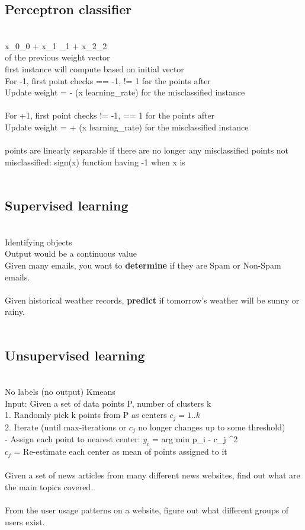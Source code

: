 \documentclass[11pt]{article}
\begin{document}
\subsection*{Perceptron classifier}\\
x_{0}\theta_{0} + x_{1} \theta_{1} + x_{2}\theta_{2}\\\) of the previous weight vector
\\
first instance will compute based on initial vector\\
For -1, first point checks == -1, != 1 for the points after\\
Update weight = - (x \times\) learning\_rate) for the misclassified instance\\
\\\)
For +1, first point checks != -1, == 1 for the points after\\
Update weight =  + (x \times\) learning\_rate) for the misclassified instance\\
\\
points are linearly separable if there are no longer any misclassified points
not misclassified: sign(x) function having -1 when x is 
\\\\
\subsection*{Supervised learning}\\
Identifying objects \\
Output would be a continuous value\\
Given many emails, you want to \textbf{determine} if they are Spam or Non-Spam emails.
\\
\\
Given historical weather records, \textbf{predict} if tomorrow's weather will be sunny or rainy.
\\\\
\subsection*{Unsupervised learning}\\
No labels (no output)
Kmeans 
\\
Input: Given a set of data points P, number of clusters k
\\1. Randomly pick k points from P as centers $c_{j} = 1.. k$
 \\2.
Iterate (until max-iterations or $c_{j}$ no longer changes up to some threshold) \\
- Assign each point to nearest center: $y_{i}$ = arg min {\parallel p_{i} - c_{j} \parallel}^{2}\)
\\
$c_{j}$ =  Re-estimate each center as mean of points assigned to it
\\\\
Given a set of news articles from many different news websites, find out what are the main topics covered.
\\\\
From the user usage patterns on a website, figure out what different groups of users exist.
\\\\
\end{document}
